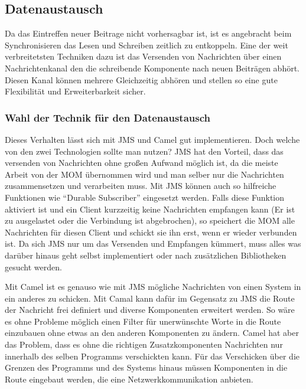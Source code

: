 

\subsection{Datenaustausch} %
\label{sub:datenaustausch}

Da das Eintreffen neuer Beitrage nicht vorhersagbar ist, ist es angebracht beim Synchronisieren das Lesen und Schreiben zeitlich zu entkoppeln. Eine der weit verbreitetsten Techniken dazu ist das Versenden von Nachrichten über einen Nachrichtenkanal den die schreibende Komponente nach neuen Beiträgen abhört. Diesen Kanal können mehrere Gleichzeitig abhören und stellen so eine gute Flexibilität und Erweiterbarkeit sicher. 

\subsubsection{Wahl der Technik für den Datenaustausch} %
\label{ssub:wahl_der_technik_für_den_datenaustausch}

Dieses Verhalten lässt sich mit JMS und Camel gut implementieren. Doch welche von den zwei Technologien sollte man nutzen? JMS hat den Vorteil, dass das versenden von Nachrichten ohne großen Aufwand möglich ist, da die meiste Arbeit von der MOM übernommen wird und man selber nur die Nachrichten zusammensetzen und verarbeiten muss. Mit JMS können auch so hilfreiche Funktionen wie \enquote{Durable Subscriber} eingesetzt werden. Falls diese Funktion aktiviert ist und ein Client kurzzeitig keine Nachrichten empfangen kann (Er ist zu ausgelastet oder die Verbindung ist abgebrochen), so speichert die MOM alle Nachrichten für diesen Client und schickt sie ihn erst, wenn er wieder verbunden ist. Da sich JMS nur um das Versenden und Empfangen kümmert, muss alles was darüber hinaus geht selbst implementiert oder nach zusätzlichen Bibliotheken gesucht werden. 

Mit Camel ist es genauso wie mit JMS mögliche Nachrichten von einen System in ein anderes zu schicken. Mit Camal kann dafür im Gegensatz zu JMS die Route der Nachricht frei definiert und diverse Komponenten erweitert werden. So wäre es ohne Probleme möglich einen Filter für unerwünschte Worte in die Route einzubauen ohne etwas an den anderen Komponenten zu ändern. Camel hat aber das Problem, dass es ohne die richtigen Zusatzkomponenten Nachrichten nur innerhalb des selben Programms verschickten kann. Für das Verschicken über die Grenzen des Programms und des Systems hinaus müssen Komponenten in die Route eingebaut werden, die eine Netzwerkkommunikation anbieten. 

